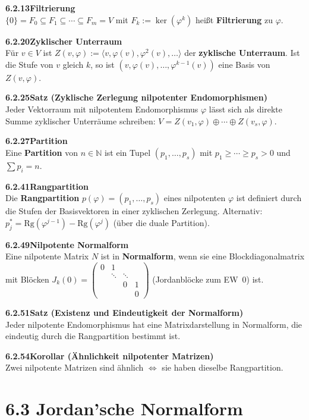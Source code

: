 \documentclass[a4paper,12pt]{article}
\newcommand{\gentry}[3]{%
  \noindent\textbf{#1\quad #2}\nopagebreak\\[0.2em]
  #3\par\smallskip
}
\begin{document}
\gentry{6.2.13}{Filtrierung}{%
  $\{0\} = F_0 \subseteq F_1 \subseteq \cdots \subseteq F_m = V$ mit $F_k := \ker(\varphi^k)$ heißt \textbf{Filtrierung} zu $\varphi$.
}

\gentry{6.2.20}{Zyklischer Unterraum}{%
  Für $v \in V$ ist $Z(v, \varphi) := \langle v, \varphi(v), \varphi^2(v), \ldots \rangle$ der \textbf{zyklische Unterraum}.
  Ist die Stufe von $v$ gleich $k$, so ist $(v, \varphi(v), \ldots, \varphi^{k-1}(v))$ eine Basis von $Z(v,\varphi)$.
}

\gentry{6.2.25}{Satz (Zyklische Zerlegung nilpotenter Endomorphismen)}{%
  Jeder Vektorraum mit nilpotentem Endomorphismus $\varphi$ lässt sich als direkte Summe zyklischer Unterräume schreiben:
  $V = Z(v_1,\varphi) \oplus \cdots \oplus Z(v_s, \varphi)$.
}

\gentry{6.2.27}{Partition}{%
  Eine \textbf{Partition} von $n \in \mathbb{N}$ ist ein Tupel $(p_1, \ldots, p_s)$ mit $p_1 \geq \cdots \geq p_s > 0$ und $\sum p_i = n$.
}

\gentry{6.2.41}{Rangpartition}{%
  Die \textbf{Rangpartition} $p(\varphi) = (p_1, \ldots, p_s)$ eines nilpotenten $\varphi$ ist definiert durch die Stufen der Basisvektoren in einer zyklischen Zerlegung.
  Alternativ: $p_j^* = \mathrm{Rg}(\varphi^{j-1}) - \mathrm{Rg}(\varphi^j)$ (über die duale Partition).
}

\gentry{6.2.49}{Nilpotente Normalform}{%
  Eine nilpotente Matrix $N$ ist in \textbf{Normalform}, wenn sie eine Blockdiagonalmatrix mit Blöcken
  $J_k(0) = \begin{pmatrix}0&1&&\\&\ddots&\ddots&\\&&0&1\\&&&0\end{pmatrix}$ (Jordanblöcke zum EW~0) ist.
}

\gentry{6.2.51}{Satz (Existenz und Eindeutigkeit der Normalform)}{%
  Jeder nilpotente Endomorphismus hat eine Matrixdarstellung in Normalform, die eindeutig durch die Rangpartition bestimmt ist.
}

\gentry{6.2.54}{Korollar (Ähnlichkeit nilpotenter Matrizen)}{%
  Zwei nilpotente Matrizen sind ähnlich $\iff$ sie haben dieselbe Rangpartition.
}

\section*{6.3 \quad Jordan'sche Normalform}
\end{document}
